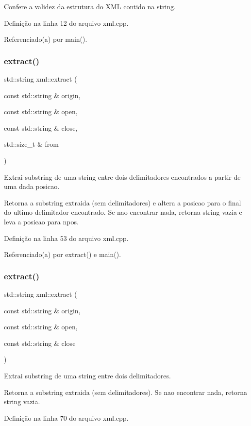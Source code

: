 Confere a validez da estrutura do X\+ML contido na string. 



Definição na linha 12 do arquivo xml.\+cpp.



Referenciado(a) por main().

\mbox{\label{namespacexml_a71783e2f9895997decf223259658b1d9}} 
\subsubsection{\texorpdfstring{extract()}{extract()}\hspace{0.1cm}{\footnotesize\ttfamily [1/2]}}
{\footnotesize\ttfamily std\+::string xml\+::extract (\begin{DoxyParamCaption}\item[{const std\+::string \&}]{origin,  }\item[{const std\+::string \&}]{open,  }\item[{const std\+::string \&}]{close,  }\item[{std\+::size\+\_\+t \&}]{from }\end{DoxyParamCaption})}



Extrai substring de uma string entre dois delimitadores encontrados a partir de uma dada posicao. 

Retorna a substring extraida (sem delimitadores) e altera a posicao para o final do ultimo delimitador encontrado. Se nao encontrar nada, retorna string vazia e leva a posicao para npos. 

Definição na linha 53 do arquivo xml.\+cpp.



Referenciado(a) por extract() e main().

\mbox{\label{namespacexml_a0737f196962e22c2120336ba27909da1}} 
\subsubsection{\texorpdfstring{extract()}{extract()}\hspace{0.1cm}{\footnotesize\ttfamily [2/2]}}
{\footnotesize\ttfamily std\+::string xml\+::extract (\begin{DoxyParamCaption}\item[{const std\+::string \&}]{origin,  }\item[{const std\+::string \&}]{open,  }\item[{const std\+::string \&}]{close }\end{DoxyParamCaption})}



Extrai substring de uma string entre dois delimitadores. 

Retorna a substring extraida (sem delimitadores). Se nao encontrar nada, retorna string vazia. 

Definição na linha 70 do arquivo xml.\+cpp.

